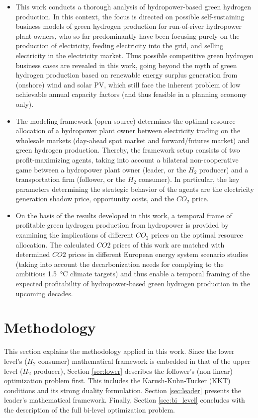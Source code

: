 \documentclass[review]{elsarticle}
\begin{document}
\begin{itemize}
	\item This work conducts a thorough analysis of hydropower-based green hydrogen production. In this context, the focus is directed on possible self-sustaining business models of green hydrogen production for run-of-river hydropower plant owners, who so far predominantly have been focusing purely on the production of electricity, feeding electricity into the grid, and selling electricity in the electricity market. Thus possible competitive green hydrogen business cases are revealed in this work, going beyond the myth of green hydrogen production based on renewable energy surplus generation from (onshore) wind and solar PV, which still face the inherent problem of low achievable annual capacity factors (and thus feasible in a planning economy only). 
	
	\item The modeling framework (open-source) determines the optimal resource allocation of a hydropower plant owner between electricity trading on the wholesale markets (day-ahead spot market and forward/futures market) and green hydrogen production. Thereby, the framework setup consists of two profit-maximizing agents, taking into account a bilateral non-cooperative game between a hydropower plant owner (leader, or the $H_2$ producer) and a transportation firm (follower, or the $H_2$ consumer). In particular, the key parameters determining the strategic behavior of the agents are the electricity generation shadow price, opportunity costs, and the $CO_2$ price.  
	
	\item On the basis of the results developed in this work, a temporal frame of profitable green hydrogen production from hydropower is provided by examining the implications of different $CO_2$ prices on the optimal resource allocation. The calculated $CO2$ prices of this work are matched with determined $CO2$ prices in different European energy system scenario studies (taking into account the decarbonization needs for complying to the ambitious \SI{1.5}{\degreeCelsius} climate targets) and thus enable a temporal framing of the expected profitability of hydropower-based green hydrogen production in the upcoming decades. 
\end{itemize}
\newpage
\section{Methodology}\label{methodology}
This section explains the methodology applied in this work. Since the lower level's ($H_2$ consumer) mathematical framework is embedded in that of the upper level ($H_2$ producer), Section \ref{sec:lower} describes the follower's (non-linear) optimization problem first. This includes the Karush-Kuhn-Tucker (KKT) conditions and its strong duality formulation. Section \ref{sec:leader} presents the leader's mathematical framework. Finally, Section \ref{sec:bi_level} concludes with the description of the full bi-level optimization problem.
\end{document}
